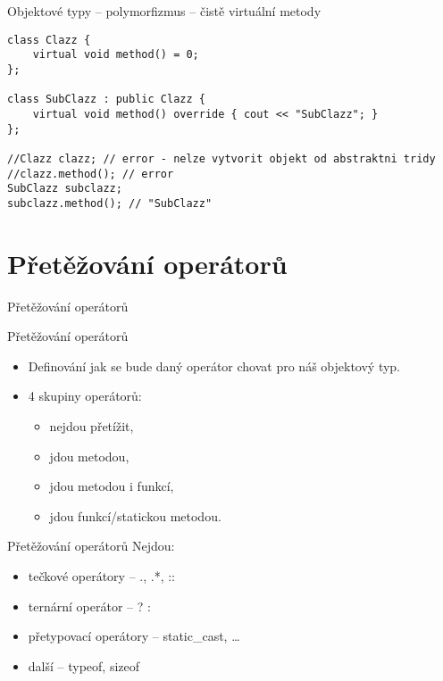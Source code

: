 \begin{frame}[fragile]
\begin{exampleblock}{Objektové typy -- polymorfizmus -- čistě virtuální metody} 
\begin{lstlisting}
class Clazz {
	virtual void method() = 0;
};

class SubClazz : public Clazz { 
	virtual void method() override { cout << "SubClazz"; }
};

//Clazz clazz; // error - nelze vytvorit objekt od abstraktni tridy
//clazz.method(); // error
SubClazz subclazz;
subclazz.method(); // "SubClazz"
\end{lstlisting}
\end{exampleblock}
\end{frame}

\section{Přetěžování operátorů}

\begin{frame}
\begin{block}{}
\begin{center}
\Huge
Přetěžování operátorů
\end{center}
\end{block}
\end{frame}

\begin{frame}[fragile]
\begin{block}{Přetěžování operátorů} 
\begin{itemize}
\item Definování jak se bude daný operátor chovat pro náš objektový typ.
\item 4 skupiny operátorů:
\begin{itemize}
\item nejdou přetížit,
\item jdou metodou,
\item jdou metodou i funkcí,
\item jdou funkcí/statickou metodou.
\end{itemize}
\end{itemize}
\end{block}
\end{frame}



\begin{frame}[fragile]
\begin{block}{Přetěžování operátorů} 
Nejdou:
\begin{itemize}
\item tečkové operátory -- ., .*, ::
\item ternární operátor -- ? :
\item přetypovací operátory -- static\_cast, \ldots
\item další -- typeof, sizeof
\end{itemize}
\end{block}
\end{frame}

